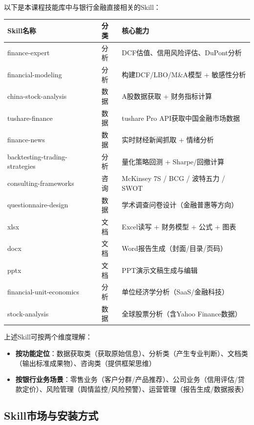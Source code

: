 以下是本课程技能库中与银行金融直接相关的Skill：

\begin{table}[H]
\centering
\begin{tabular}{llp{5.5cm}}
\toprule
\textbf{Skill名称} & \textbf{分类} & \textbf{核心能力} \\
\midrule
finance-expert & 分析 & DCF估值、信用风险评估、DuPont分析 \\
financial-modeling & 分析 & 构建DCF/LBO/M\&A模型 + 敏感性分析 \\
china-stock-analysis & 数据 & A股数据获取 + 财务指标计算 \\
tushare-finance & 数据 & tushare Pro API获取中国金融市场数据 \\
finance-news & 数据 & 实时财经新闻抓取 + 情绪分析 \\
backtesting-trading-strategies & 分析 & 量化策略回测 + Sharpe/回撤计算 \\
consulting-frameworks & 咨询 & McKinsey 7S / BCG / 波特五力 / SWOT \\
questionnaire-design & 数据 & 学术调查问卷设计（金融普惠等方向） \\
xlsx & 文档 & Excel读写 + 财务模型 + 公式 + 图表 \\
docx & 文档 & Word报告生成（封面/目录/页码） \\
pptx & 文档 & PPT演示文稿生成与编辑 \\
financial-unit-economics & 分析 & 单位经济学分析（SaaS/金融科技） \\
stock-analysis & 数据 & 全球股票分析（含Yahoo Finance数据） \\
\bottomrule
\end{tabular}
\end{table}

\begin{notebox}[Skill分类维度]
上述Skill可按两个维度理解：
\begin{itemize}[leftmargin=1em]
  \item \textbf{按功能定位}：数据获取类（获取原始信息）、分析类（产生专业判断）、文档类（输出标准成果物）、咨询类（提供框架思维）
  \item \textbf{按银行业务场景}：零售业务（客户分群/产品推荐）、公司业务（信用评估/贷款定价）、风险管理（舆情监控/风险预警）、运营管理（报告生成/数据报表）
\end{itemize}
\end{notebox}

\subsection{Skill市场与安装方式}

